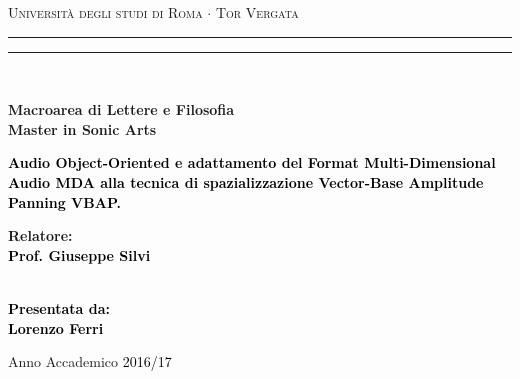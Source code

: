 \documentclass[12pt,a4paper]{report}
\begin{document}
\begin{titlepage}
\begin{center}
{\Large{\textsc{Università degli studi di Roma $\cdot$ Tor Vergata}}} 
\rule[0.1cm]{15.8cm}{0.1mm}
\rule[0.5cm]{15.8cm}{0.6mm}
\\\vspace{3mm}

{\small{\bf Macroarea di Lettere e Filosofia \\ Master in Sonic Arts}}

\end{center}

\vspace{23mm}

\begin{center}
\begin{spacing}{1.7}
\textcolor{black}{
\linespread{5}
{\LARGE{\bf 
Audio Object-Oriented e adattamento del Format Multi-Dimensional Audio MDA alla tecnica di spazializzazione Vector-Base Amplitude Panning VBAP.
}}}

\end{spacing}
\end{center}

\vspace{50mm} \par \noindent

\begin{minipage}[t]{0.47\textwidth}

{\large{\bf Relatore: \vspace{2mm}\\\textcolor{black}{
Prof. Giuseppe Silvi}\\\\

}
}
\end{minipage}
%
\hfill
%
\begin{minipage}[t]{0.47\textwidth}\raggedleft \textcolor{black}{
{\large{\bf Presentata da:
\vspace{2mm}\\
Lorenzo Ferri}}}
\end{minipage}

\vspace{5mm}

\begin{center}

{\large{%

Anno Accademico \textcolor{black}{2016/17}}}
\end{center}

\newpage\null\thispagestyle{empty}

\end{titlepage}
\end{document}
